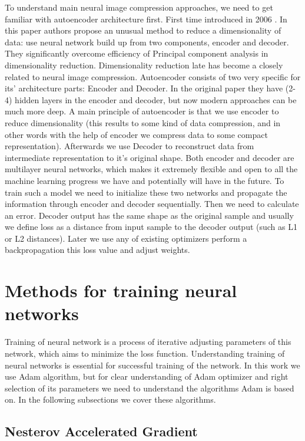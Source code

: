 To understand main neural image compression approaches, we need to get familiar with autoencoder architecture first. First time introduced in 2006 \cite{Autoencoder_2006}. In this paper authors propose an unusual method to reduce a dimensionality of data: use neural network build up from two components, encoder and decoder. They significantly overcome efficiency of Principal component analysis \cite{pca} in dimensionality reduction. Dimensionality reduction late has become a closely related to neural image compression. Autoencoder consists of two very specific for its' architecture parts: Encoder and Decoder. In the original paper they have (2-4) hidden layers in the encoder and decoder, but now modern approaches can be much more deep. A main principle of autoencoder is that we use encoder to reduce dimensionality (this results to some kind of data compression, and in other words with the help of encoder we compress data to some compact representation). Afterwards we use Decoder to reconstruct data from intermediate representation to it's original shape. Both encoder and decoder are multilayer neural networks, which makes it extremely flexible and open to all the machine learning progress we have and potentially will have in the future. To train such a model we need to initialize these two networks and propagate the information through encoder and decoder sequentially. Then we need to calculate an error. Decoder output has the same shape as the original sample and usually we define loss as a distance from input sample to the decoder output (such as L1 or L2 distances). Later we use any of existing optimizers perform a backpropagation this loss value and adjust weights.

\section{Methods for training neural networks}

Training of neural network is a process of iterative adjusting parameters of this network, which aims to minimize the loss function. Understanding training of neural networks is essential for successful training of the network. In this work we use Adam \cite{kingma_adam_2017} algorithm, but for clear understanding of Adam optimizer and right selection of its parameters we need to understand the algorithms Adam is based on. In the following subsections we cover these algorithms.

\subsection{Nesterov Accelerated Gradient}

